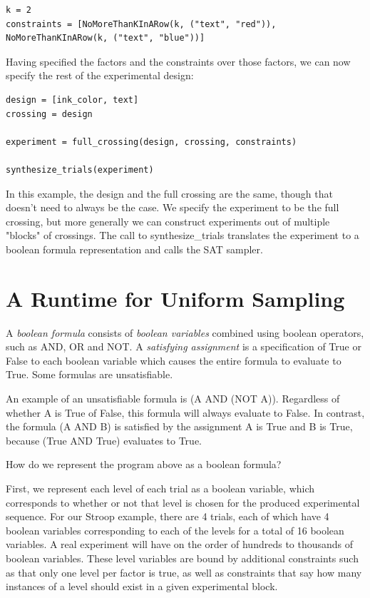 \begin{verbatim}
k = 2
constraints = [NoMoreThanKInARow(k, ("text", "red")), NoMoreThanKInARow(k, ("text", "blue"))]
\end{verbatim}

Having specified the factors and the constraints over those factors, we can now specify the rest of the experimental design:

\begin{verbatim}
design = [ink_color, text]
crossing = design

experiment = full_crossing(design, crossing, constraints)

synthesize_trials(experiment)
\end{verbatim}

In this example, the design and the full crossing are the same, though that doesn't need to always be the case. We specify the experiment to be the full crossing, but more generally we can construct experiments out of multiple "blocks" of crossings. The call to synthesize\_trials translates the experiment to a boolean formula representation and calls the SAT sampler.

\section{A Runtime for Uniform Sampling}

A \emph{boolean formula} consists of \emph{boolean variables} combined using boolean operators, such as AND, OR and NOT. A \emph{satisfying assignment} is a specification of True or False to each boolean variable which causes the entire formula to evaluate to True. Some formulas are unsatisfiable.

An example of an unsatisfiable formula is (A AND (NOT A)). Regardless of whether A is True of False, this formula will always evaluate to False. In contrast, the formula (A AND B) is satisfied by the assignment A is True and B is True, because (True AND True) evaluates to True.

How do we represent the program above as a boolean formula?

First, we represent each level of each trial as a boolean variable, which corresponds to whether or not that level is chosen for the produced experimental sequence. For our Stroop example, there are 4 trials, each of which have 4 boolean variables corresponding to each of the levels for a total of 16 boolean variables. A real experiment will have on the order of hundreds to thousands of boolean variables. These level variables are bound by additional constraints such as that only one level per factor is true, as well as constraints that say how many instances of a level should exist in a given experimental block.

